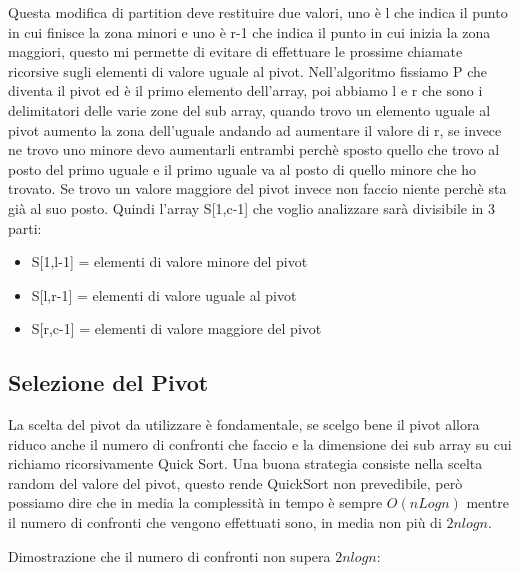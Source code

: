 \documentclass[14pt]{extreport}
\begin{document}
Questa modifica di partition deve restituire due valori, uno è l che indica il punto in cui finisce la zona minori e uno è r-1 che indica il punto in cui inizia la zona maggiori, questo mi permette di evitare di effettuare le prossime chiamate ricorsive sugli elementi di valore uguale al pivot.
Nell'algoritmo fissiamo P che diventa il pivot ed è il primo elemento dell'array, poi abbiamo l e r che sono i delimitatori delle varie zone del sub array, quando trovo un elemento uguale al pivot aumento la zona dell'uguale andando ad aumentare il valore di r, se invece ne trovo uno minore devo aumentarli entrambi perchè sposto quello che trovo al posto del primo uguale e il primo uguale va al posto di quello minore che ho trovato. Se trovo un valore maggiore del pivot invece non faccio niente perchè sta già al suo posto.
Quindi l'array S[1,c-1] che voglio analizzare sarà divisibile in 3 parti:
\begin{itemize}
    \item S[1,l-1] = elementi di valore minore del pivot
    \item S[l,r-1] = elementi di valore uguale al pivot
    \item S[r,c-1] = elementi di valore maggiore del pivot
\end{itemize}

\subsection{Selezione del Pivot}

La scelta del pivot da utilizzare è fondamentale, se scelgo bene il pivot allora riduco anche il numero di confronti che faccio e la dimensione dei sub array su cui richiamo ricorsivamente Quick Sort.
Una buona strategia consiste nella scelta random del valore del pivot, questo rende QuickSort non prevedibile, però possiamo dire che in media la complessità in tempo è sempre $O(nLogn)$ mentre il numero di confronti che vengono effettuati sono, in media non più di $2nlogn$.

Dimostrazione che il numero di confronti non supera $2nlogn$:
\end{document}

